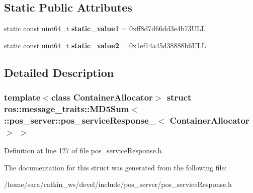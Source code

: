 \subsection*{Static Public Attributes}
\begin{DoxyCompactItemize}
\item 
\mbox{\label{structros_1_1message__traits_1_1MD5Sum_3_01_1_1pos__server_1_1pos__serviceResponse___3_01ContainerAllocator_01_4_01_4_a21773afd59ee14fc29a44584bb7778dc}} 
static const uint64\+\_\+t {\bfseries static\+\_\+value1} = 0xff8d7d66dd3e4b73\+U\+LL
\item 
\mbox{\label{structros_1_1message__traits_1_1MD5Sum_3_01_1_1pos__server_1_1pos__serviceResponse___3_01ContainerAllocator_01_4_01_4_a5196283c8c840e4c2c36b17a7e5671a6}} 
static const uint64\+\_\+t {\bfseries static\+\_\+value2} = 0x1ef14a45d38888b6\+U\+LL
\end{DoxyCompactItemize}


\subsection{Detailed Description}
\subsubsection*{template$<$class Container\+Allocator$>$\newline
struct ros\+::message\+\_\+traits\+::\+M\+D5\+Sum$<$ \+::pos\+\_\+server\+::pos\+\_\+service\+Response\+\_\+$<$ Container\+Allocator $>$ $>$}



Definition at line 127 of file pos\+\_\+service\+Response.\+h.



The documentation for this struct was generated from the following file\+:\begin{DoxyCompactItemize}
\item 
/home/sara/catkin\+\_\+ws/devel/include/pos\+\_\+server/pos\+\_\+service\+Response.\+h\end{DoxyCompactItemize}
